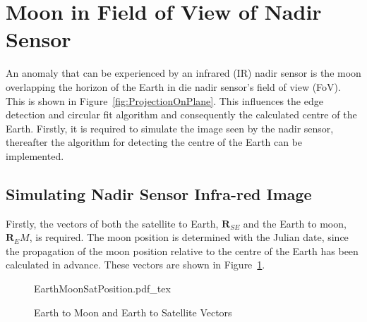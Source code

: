 \section{Moon in Field of View of Nadir Sensor}
An anomaly that can be experienced by an infrared (IR) nadir sensor is the moon overlapping the horizon of the Earth in die nadir sensor's field of view (FoV). This is shown in Figure~\ref{fig:ProjectionOnPlane}. This influences the edge detection and circular fit algorithm \cite{wessels2018infrared, van2008infrared} and consequently the calculated centre of the Earth. Firstly, it is required to simulate the image seen by the nadir sensor, thereafter the algorithm for detecting the centre of the Earth can be implemented.

\subsection{Simulating Nadir Sensor Infra-red Image}
Firstly, the vectors of both the satellite to Earth, $\mathbf{R}_{SE}$ and the Earth to moon, $\mathbf{R}_EM$, is required. The moon position is determined with the Julian date, since the propagation of the moon position relative to the centre of the Earth has been calculated in advance. These vectors are shown in Figure~\ref{fig:EarthMoonSatPosition}. 

\begin{figure}[!htb]
	\centering
	\def\svgwidth{14cm}
	{EarthMoonSatPosition.pdf_tex}
	\caption{Earth to Moon and Earth to Satellite Vectors}
	\label{fig:EarthMoonSatPosition}
\end{figure}

